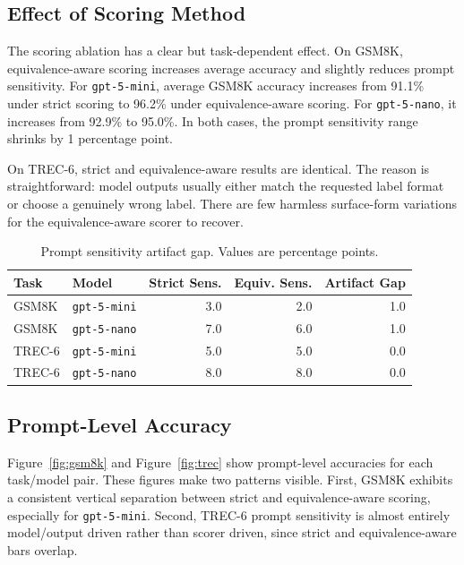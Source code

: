 \documentclass[11pt]{article}
\begin{document}
\subsection{Effect of Scoring Method}

The scoring ablation has a clear but task-dependent effect. On GSM8K, equivalence-aware scoring increases average accuracy and slightly reduces prompt sensitivity. For \texttt{gpt-5-mini}, average GSM8K accuracy increases from 91.1\% under strict scoring to 96.2\% under equivalence-aware scoring. For \texttt{gpt-5-nano}, it increases from 92.9\% to 95.0\%. In both cases, the prompt sensitivity range shrinks by 1 percentage point.

On TREC-6, strict and equivalence-aware results are identical. The reason is straightforward: model outputs usually either match the requested label format or choose a genuinely wrong label. There are few harmless surface-form variations for the equivalence-aware scorer to recover.

\begin{table}[h]
\centering
\begin{tabular}{llrrr}
\toprule
Task & Model & Strict Sens. & Equiv. Sens. & Artifact Gap \\
\midrule
GSM8K & \texttt{gpt-5-mini} & 3.0 & 2.0 & 1.0 \\
GSM8K & \texttt{gpt-5-nano} & 7.0 & 6.0 & 1.0 \\
TREC-6 & \texttt{gpt-5-mini} & 5.0 & 5.0 & 0.0 \\
TREC-6 & \texttt{gpt-5-nano} & 8.0 & 8.0 & 0.0 \\
\bottomrule
\end{tabular}
\caption{Prompt sensitivity artifact gap. Values are percentage points.}
\label{tab:artifact}
\end{table}

\subsection{Prompt-Level Accuracy}

Figure~\ref{fig:gsm8k} and Figure~\ref{fig:trec} show prompt-level accuracies for each task/model pair. These figures make two patterns visible. First, GSM8K exhibits a consistent vertical separation between strict and equivalence-aware scoring, especially for \texttt{gpt-5-mini}. Second, TREC-6 prompt sensitivity is almost entirely model/output driven rather than scorer driven, since strict and equivalence-aware bars overlap.
\end{document}
